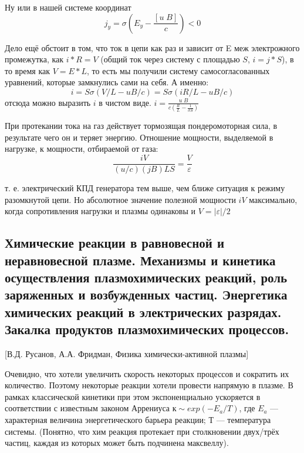 \documentclass[10pt, a4paper]{article}
\numberwithin{equation}{section}
\begin{document}
Ну или в нашей системе координат 
\begin{equation}
	j_y=\sigma(E_y-\frac{[u\;B]}{c}) <0
\end{equation}

Дело ещё обстоит в том, что ток в цепи как раз и зависит от E меж электрожного промежутка, как $i*R=V$ (общий ток через систему с площадью $S$, $i=j*S$), в то время как $V=E*L$, то есть мы получили систему самосогласованных уравнений, которые замкнулись сами на себя. А именно:
\begin{equation}
	i=S \sigma(V/L-uB/c)=S \sigma(iR/L-uB/c)
\end{equation}
отсюда можно выразить $i$ в чистом виде. $i=\frac{u\;B}{c(\frac{R}{L}-\frac{1}{\sigma S})}$

При протекании тока на газ действует тормозящая пондеромоторная сила, в результате чего он и теряет энергию. Отношение мощности, выделяемой в нагрузке, к мощности, отбираемой от газа: 
\begin{equation}
	\frac{iV}{(u/c)(jB)LS}=\frac{V}{\varepsilon}
\end{equation}

т. е. электрический КПД генератора тем выше, чем ближе ситуация к режиму разомкнутой цепи. Но абсолютное значение полезной мощности $iV$ максимально, когда сопротивления нагрузки и плазмы одинаковы и $V=|\varepsilon|/2$


\subsection{Химические реакции в равновесной и неравновесной плазме. \textcolor[rgb]{1,0,0}{Механизмы и кинетика осуществления плазмохимических реакций, роль заряженных и возбужденных частиц. Энергетика химических реакций в электрических разрядах}. Закалка продуктов плазмохимических процессов.}

\label{14.6}

 
[В.Д. Русанов, А.А. Фридман, Физика химически-активной плазмы]

Очевидно, что хотели увеличить скорость некоторых процессов и сократить их количество. Поэтому некоторые реакции хотели провести напрямую в плазме. В рамках классической кинетики при этом экспоненциально ускоряется в соответствии с известным законом Аррениуса $ к \sim exp(-E_{a}/T)$, где $E_a$ — характерная величина энергетического барьера реакции; Т — температура системы. (Понятно, что хим реакция протекает при столкновении двух/трёх частиц, каждая из которых может быть подчинена максвеллу).
 
\end{document}
